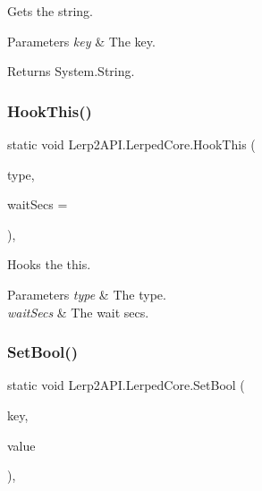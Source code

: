 Gets the string. 


\begin{DoxyParams}{Parameters}
{\em key} & The key.\\
\hline
\end{DoxyParams}
\begin{DoxyReturn}{Returns}
System.\+String.
\end{DoxyReturn}
\mbox{\label{class_lerp2_a_p_i_1_1_lerped_core_af512946193066845c4eedb9aee4c5a24}} 
\subsubsection{\texorpdfstring{Hook\+This()}{HookThis()}}
{\footnotesize\ttfamily static void Lerp2\+A\+P\+I.\+Lerped\+Core.\+Hook\+This (\begin{DoxyParamCaption}\item[{Type}]{type,  }\item[{int}]{wait\+Secs = {} }\end{DoxyParamCaption})\hspace{0.3cm}{\ttfamily [inline]}, {\ttfamily [static]}}



Hooks the this. 


\begin{DoxyParams}{Parameters}
{\em type} & The type.\\
\hline
{\em wait\+Secs} & The wait secs.\\
\hline
\end{DoxyParams}
\mbox{\label{class_lerp2_a_p_i_1_1_lerped_core_a48b631ddb59cbfbe36158a72037e674b}} 
\subsubsection{\texorpdfstring{Set\+Bool()}{SetBool()}}
{\footnotesize\ttfamily static void Lerp2\+A\+P\+I.\+Lerped\+Core.\+Set\+Bool (\begin{DoxyParamCaption}\item[{string}]{key,  }\item[{bool}]{value }\end{DoxyParamCaption})\hspace{0.3cm}{\ttfamily [inline]}, {\ttfamily [static]}}



